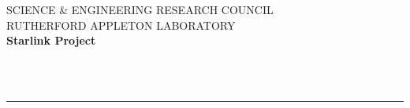 \begin{htmlonly}
   \newcommand{\sstparameters}[1]{
      \item[Parameters:] \\
      \begin{description}
         #1
      \end{description}
      \\
   }

   \newcommand{\sstexamples}[1]{
      \item[Examples:] \\
      \begin{description}
         #1
      \end{description}
      \\
   }

   \newcommand{\sstsubsection}[1]{\item[{#1}]}

   \newcommand{\sstexamplesubsection}[2]{\item[{\ssttt #1}] #2}

   \newcommand{\sstnotes}[1]{\item[Notes:] #1 }

   \newcommand{\sstdiytopic}[2]{\item[{#1}] #2 }

   \newcommand{\sstimplementationstatus}[1]{
      \item[Implementation Status:] #1
   }

   \newcommand{\sstitemlist}[1]{
      \begin{itemize}
         #1
      \end{itemize}
      \\
   }
   \newcommand{\sstitem}{\item}

\end{htmlonly}





\thispagestyle{empty}
SCIENCE \& ENGINEERING RESEARCH COUNCIL \hfill \stardocname\\
RUTHERFORD APPLETON LABORATORY\\
{\large\bf Starlink Project\\}
{\large\bf \stardoccategory\ \stardocnumber}
\begin{flushright}
\stardocauthors\\
\stardocdate
\end{flushright}
\vspace{-4mm}
\rule{\textwidth}{0.5mm}
\vspace{5mm}
\begin{center}
{\Large\bf \stardoctitle}
\end{center}
\vspace{5mm}

